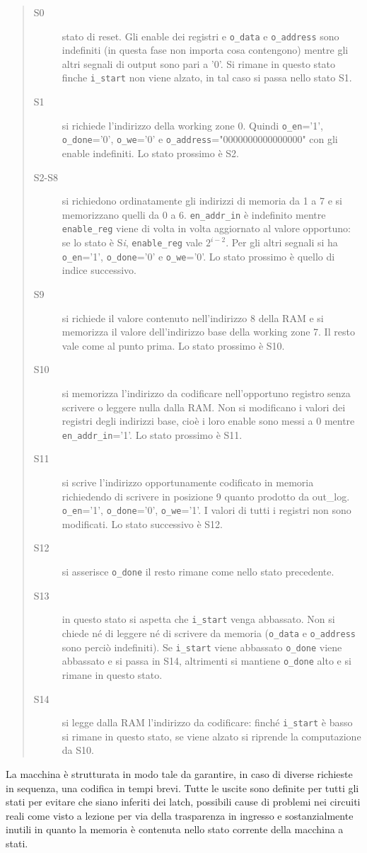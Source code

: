 \documentclass [a4paper, 12pt]{article}
\begin{document}
\begin{quote}
\begin{description}
\item[S0] stato di reset. Gli enable dei registri e \texttt{o\_data} e \texttt{o\_address} sono indefiniti (in questa fase non importa cosa contengono) mentre gli altri segnali di output sono pari a '0'. Si rimane in questo stato finche \texttt{i\_start} non viene alzato, in tal caso si passa nello stato S1.
\item[S1] si richiede l'indirizzo della working zone 0. Quindi \texttt{o\_en}='1', \texttt{o\_done}='0', \texttt{o\_we}='0' e \texttt{o\_address}="0000000000000000" con gli enable indefiniti. Lo stato prossimo \`e S2.
\item[S2-S8] si richiedono ordinatamente gli indirizzi di memoria da 1 a 7  e si memorizzano quelli da 0 a 6. \texttt{en\_addr\_in} \`e indefinito mentre \texttt{enable\_reg} viene di volta in volta aggiornato al valore opportuno: se lo stato \`e S\textit{i}, \texttt{enable\_reg} vale $2^{i-2}$. Per gli altri segnali si ha  \texttt{o\_en}='1', \texttt{o\_done}='0' e \texttt{o\_we}='0'. Lo stato prossimo \`e quello di indice successivo.
\item[S9] si richiede il valore contenuto nell'indirizzo 8 della RAM e si memorizza il valore dell'indirizzo base della working zone 7. Il resto vale come al punto prima. Lo stato prossimo \`e S10.
\item[S10] si memorizza l'indirizzo da codificare nell'opportuno registro senza scrivere o leggere nulla dalla RAM. Non si modificano i valori dei registri degli indirizzi base, cio\`e i loro enable sono messi a 0 mentre \texttt{en\_addr\_in}='1'. Lo stato prossimo \`e S11.
\item[S11] si scrive l'indirizzo opportunamente codificato in memoria richiedendo di scrivere in posizione 9 quanto prodotto da out\_log. \texttt{o\_en}='1', \texttt{o\_done}='0', \texttt{o\_we}='1'. I valori di tutti i registri non sono modificati. Lo stato successivo \`e S12.
\item[S12] si asserisce \texttt{o\_done} il resto rimane come nello stato precedente.
\item[S13] in questo stato si aspetta che \texttt{i\_start} venga abbassato. Non si chiede n\'e di leggere n\'e di scrivere da memoria (\texttt{o\_data} e \texttt{o\_address} sono perci\`o indefiniti). Se \texttt{i\_start} viene abbassato \texttt{o\_done} viene abbassato e si passa in S14, altrimenti si mantiene \texttt{o\_done}  alto e si rimane in questo stato.
\item[S14] si legge dalla RAM l'indirizzo da codificare: finch\'e \texttt{i\_start} \`e basso si rimane in questo stato, se viene alzato si riprende la computazione da S10.
\end{description}
\end{quote}
La macchina \`e strutturata in modo tale da garantire, in caso di diverse richieste in sequenza, una codifica in tempi brevi. Tutte le uscite sono definite per tutti gli stati per evitare che siano inferiti dei latch, possibili cause di problemi nei circuiti reali come visto a lezione per via della trasparenza in ingresso e sostanzialmente inutili in quanto la memoria \`e contenuta nello stato corrente della macchina a stati.
\end{document}
